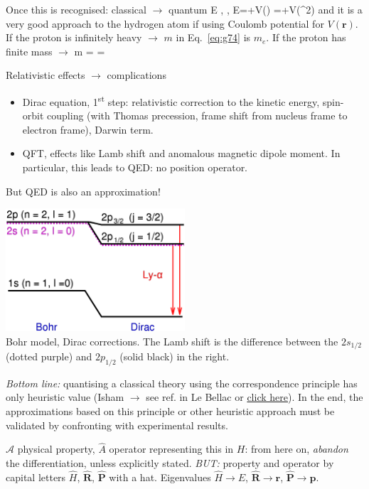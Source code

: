\documentclass[12pt]{article}
\begin{document}
Once this is recognised: classical $\to$ quantum
\be
E \rightarrow {},\quad {} \rightarrow {},\quad {} \rightarrow {}
\ee
\be
E=+V\left(\right) 
\rightarrow 
{}=+V\left(^{2}\right)
\label{eq:g74}
\ee
and it is a very good approach to the hydrogen atom
if using Coulomb potential
for $V(\mathbf{r})$.
If the proton is infinitely heavy $\to$ $m$ in Eq.~\eqref{eq:g74} is $m_e$.
If the proton has finite mass $\to$
\be
m = =\mu
\ee 


Relativistic effects $\to$ complications
\begin{itemize}
\item Dirac equation, 1\textsuperscript{st} step: 
relativistic correction to the kinetic energy,
spin-orbit coupling (with Thomas precession, frame shift from nucleus frame to electron frame),
Darwin term.
\item QFT, effects like Lamb shift and anomalous magnetic dipole moment.
In particular, this leads to QED: no position operator.
\end{itemize}
But QED is also an approximation!

\begin{center}
\includegraphics[width=0.5\textwidth]{Figures/1280px-Hydrogen-fine-structure2.png}
\\Bohr model, Dirac corrections. The Lamb shift is the difference between the 
$2s_{1/2}$ (dotted purple)
and
$2p_{1/2}$ (solid black) in the right.
\end{center}

\emph{Bottom line:} quantising a classical theory
using the correspondence principle has
only heuristic value (Isham $\to$ see ref. in Le Bellac 
or \href{https://isbnsearch.org/isbn/9781860940019}{click here}).
In the end, the approximations based 
on this principle or other heuristic
approach must be validated by confronting
with experimental results.

$\mathcal{A}$ physical property, $\hat{A}$ operator representing
this in $H$: from here on, \emph{abandon} the
differentiation, unless explicitly stated.
\emph{BUT:} property and operator by capital 
letters $\hat{H}$, $\hat{\mathbf{R}}$, $\hat{\mathbf{P}}$ with a hat.
Eigenvalues $\hat{H} \to E$, $\hat{\mathbf{R}} \to \mathbf{r}$, $\hat{\mathbf{P}} \to \mathbf{p}$.
\end{document}
